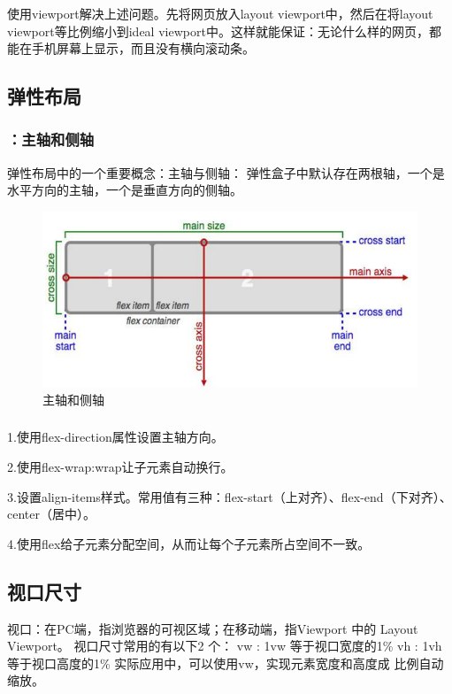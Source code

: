 \subsubsection*{}
使用viewport解决上述问题。先将网页放入layout viewport中，然后在将layout viewport等比例缩小到ideal viewport中。这样就能保证：无论什么样的网页，都能在手机屏幕上显示，而且没有横向滚动条。~\\

\subsection{弹性布局}
\subsubsection*{：主轴和侧轴}
弹性布局中的一个重要概念：主轴与侧轴： 弹性盒子中默认存在两根轴，一个是水平方向的主轴，一个是垂直方向的侧轴。
\begin{figure}[H]
    \centering
    \includegraphics[scale=0.7]{figures/2.2.9.png}
    \caption{主轴和侧轴}
\end{figure}

\subsubsection*{}
1.使用flex-direction属性设置主轴方向。

2.使用flex-wrap:wrap让子元素自动换行。

3.设置align-items样式。常用值有三种：flex-start（上对齐）、flex-end（下对齐）、center（居中）。

4.使用flex给子元素分配空间，从而让每个子元素所占空间不一致。~\\

\subsection{视口尺寸}
视口：在PC端，指浏览器的可视区域；在移动端，指Viewport 中的 Layout Viewport。 视口尺寸常用的有以下2
个： vw : 1vw 等于视口宽度的1\% vh : 1vh 等于视口高度的1\% 实际应用中，可以使用vw，实现元素宽度和高度成
比例自动缩放。~\\

